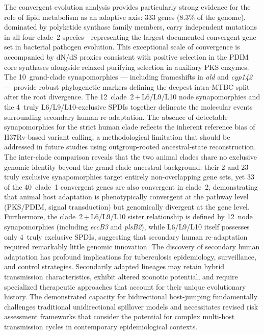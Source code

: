 \documentclass[11pt,a4paper]{article}
\begin{document}
The convergent evolution analysis provides particularly strong evidence for the
role of lipid metabolism as an adaptive axis: 333 genes (8.3\% of the genome),
dominated by polyketide synthase family members, carry independent mutations
in all four clade~2 species---representing the largest documented convergent
gene set in bacterial pathogen evolution. This exceptional scale of convergence is accompanied by dN/dS proxies
consistent with positive selection in the PDIM core synthases alongside
relaxed purifying selection in auxiliary PKS enzymes.
%
The 10~grand-clade synapomorphies --- including frameshifts in \textit{ald}
and \textit{cyp142} --- provide robust phylogenetic markers defining the
deepest intra-MTBC split after the root divergence. The
12~clade~2\,+\,L6/L9/L10 node synapomorphies and the 4~truly
L6/L9/L10-exclusive SPDIs together delineate the molecular events
surrounding secondary human re-adaptation.
The absence of detectable synapomorphies for the strict human clade reflects
the inherent reference bias of H37Rv-based variant calling, a methodological
limitation that should be addressed in future studies using outgroup-rooted
ancestral-state reconstruction.
%
The inter-clade comparison reveals that the two animal clades share no
exclusive genomic identity beyond the grand-clade ancestral background:
their 2 and 23 truly exclusive synapomorphies target entirely
non-overlapping gene sets, yet 33 of the 40~clade~1 convergent genes
are also convergent in clade~2, demonstrating that animal host adaptation
is phenotypically convergent at the pathway level (PKS/PDIM, signal
transduction) but genomically divergent at the gene level.
%
Furthermore, the clade~2\,+\,L6/L9/L10 sister relationship is defined by
12~node synapomorphies (including \textit{eccB3} and \textit{plsB2}), while
L6/L9/L10 itself possesses only 4~truly exclusive SPDIs, suggesting that
secondary human re-adaptation required remarkably little genomic innovation.
%
The discovery of secondary human adaptation has profound implications for
tuberculosis epidemiology, surveillance, and control strategies. Secondarily
adapted lineages may retain hybrid transmission characteristics, exhibit
altered zoonotic potential, and require specialized therapeutic approaches
that account for their unique evolutionary history. The demonstrated capacity
for bidirectional host-jumping fundamentally challenges traditional
unidirectional spillover models and necessitates revised risk assessment
frameworks that consider the potential for complex multi-host transmission
cycles in contemporary epidemiological contexts.
\end{document}
